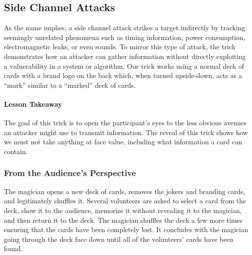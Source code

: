 \subsection{Side Channel Attacks}

As the name implies, a side channel attack strikes a target indirectly
by tracking seemingly unrelated phenomena
such as timing information, power consumption, electromagnetic leaks, or even
sounds.  To mirror this type of attack, the trick
demonstrates how an attacker can
gather information without directly exploiting
a vulnerability in a system or algorithm.
Our trick works using a normal deck of cards with a brand logo on the back which, when turned upside-down, acts as a ``mark'' similar to a ``marked'' deck of cards.

\paragraph{Lesson Takeaway}
The goal of this trick is to open the participant's eyes to the less obvious
avenues an attacker might use to transmit information.
The reveal of this trick shows how we must not
take anything at face value, including what information
a card can contain.


\subsubsection{From the Audience's Perspective}

The magician opens a new deck of cards, removes the jokers and
branding cards, and legitimately shuffles it.  Several volunteers are
asked to
select a card from the deck, show it to the audience, memorize it without
revealing it to the magician, and then return it to the deck.
The magician shuffles the deck a few more times ensuring that the cards
have
been completely lost.
It concludes with the magician going through the deck face down
until all of the volunteers' cards have been found.

